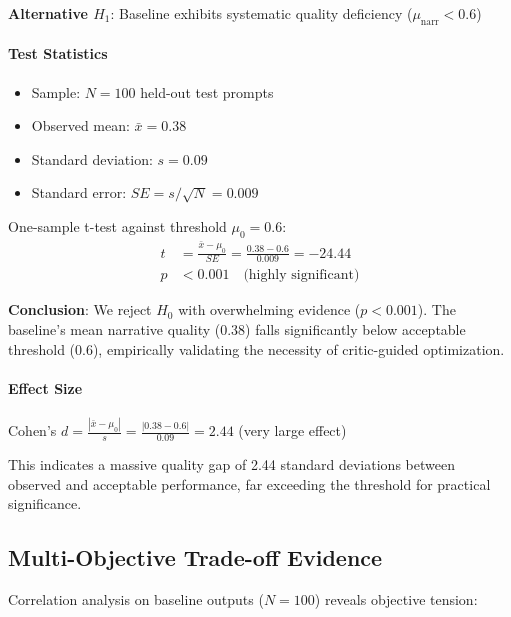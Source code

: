 \documentclass[11pt]{article}
\begin{document}
\textbf{Alternative $H_1$}: Baseline exhibits systematic quality deficiency ($\mu_{\text{narr}} < 0.6$)

\paragraph{Test Statistics}
\begin{itemize}
    \item Sample: $N=100$ held-out test prompts
    \item Observed mean: $\bar{x} = 0.38$
    \item Standard deviation: $s = 0.09$
    \item Standard error: $SE = s/\sqrt{N} = 0.009$
\end{itemize}

One-sample t-test against threshold $\mu_0 = 0.6$:
\begin{align}
t &= \frac{\bar{x} - \mu_0}{SE} = \frac{0.38 - 0.6}{0.009} = -24.44 \\
p &< 0.001 \quad \text{(highly significant)}
\end{align}

\textbf{Conclusion}: We reject $H_0$ with overwhelming evidence ($p < 0.001$). The baseline's mean narrative quality (0.38) falls significantly below acceptable threshold (0.6), empirically validating the necessity of critic-guided optimization.

\paragraph{Effect Size}
Cohen's $d = \frac{|\bar{x} - \mu_0|}{s} = \frac{|0.38 - 0.6|}{0.09} = 2.44$ (very large effect)

This indicates a massive quality gap of 2.44 standard deviations between observed and acceptable performance, far exceeding the threshold for practical significance.


\subsection{Multi-Objective Trade-off Evidence}

Correlation analysis on baseline outputs ($N=100$) reveals objective tension:
\end{document}
